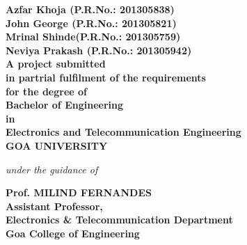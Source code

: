 \begin{center}
\vspace{0.4cm}
\bfseries{Azfar Khoja (P.R.No.: 201305838)\\John George (P.R.No.: 201305821)\\Mrinal Shinde(P.R.No.: 201305759)\\Neviya Prakash (P.R.No.: 201305942)}\\
\vspace{0.4cm}
A project submitted\\in partrial fulfilment of the requirements\\for the degree  of\\Bachelor of Engineering\\in\\Electronics and Telecommunication Engineering\\GOA UNIVERSITY\\
\vspace{0.4cm}
\begin{small}
\emph{under the guidance of}\\
\end{small}
\vspace{0.5cm}
{\bfseries \large Prof. MILIND FERNANDES}\\
{\bfseries \large Assistant Professor,\\Electronics \& Telecommunication Department\\Goa College of Engineering}\\
\vspace{1cm}
\end{center}
